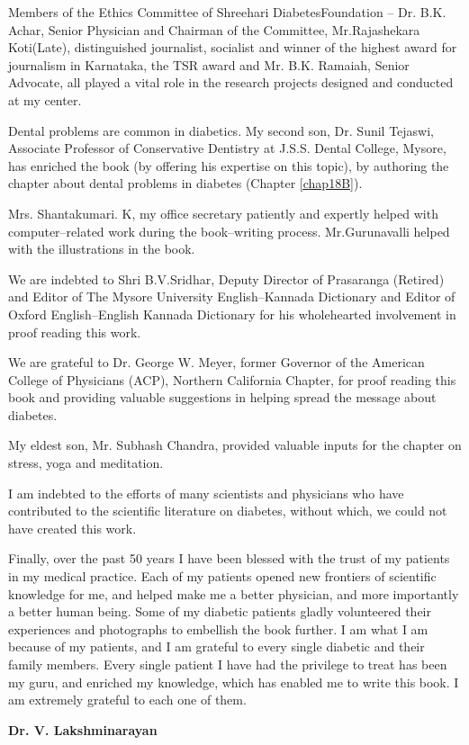 Members of the Ethics Committee of Shreehari Diabetes\break Foundation – Dr. B.K. Achar, Senior Physician and Chairman of the Committee, Mr.Rajashekara Koti(Late), distinguished journa\-list, socia\-list and winner of the highest award for journalism in Karnataka, the TSR award and Mr. B.K. Ramaiah, Senior Advocate, all played a vital role in the research projects designed and conducted at my center.

Dental problems are common in diabetics. My second son, Dr. Sunil Tejaswi, Associate Professor of Conservative Dentistry at J.S.S. Dental College, Mysore, has enriched the book (by offering his expertise on this topic), by authoring the chapter about dental problems in diabetes (Chapter \ref{chap18B}).

Mrs. Shantakumari. K, my office secretary patiently and expertly helped with computer–related work during the book–writing process. Mr.Gurunavalli helped with the illustrations in the book.

We are indebted to Shri B.V.Sridhar, Deputy Director of Prasaranga (Retired) and Editor of The Mysore University English–Kannada Dictionary and Editor of Oxford English–English Kannada Dictionary for his wholehearted involvement in proof reading this work.

We are grateful to Dr. George W. Meyer, former Governor of the American College of Physicians (ACP), Northern California Chapter, for proof reading this book and providing valuable suggestions in helping spread the message about diabetes.

My eldest son, Mr. Subhash Chandra, provided valuable inputs for the chapter on stress, yoga and meditation.

I am indebted to the efforts of many scientists and physicians who have contributed to the scientific literature on diabetes, without which, we could not have created this work.

Finally, over the past 50 years I have been blessed with the trust of my patients in my medical practice. Each of my patients opened new frontiers of scientific knowledge for me, and helped make me a better physician, and more importantly a better human being. Some of my dia\-betic patients gladly volunteered their experiences and photographs to embellish the book further. I am what I am because of my patients, and I am grateful to every single diabetic and their family members. Every single patient I have had the privilege to treat has been my guru, and enriched my knowledge, which has enabled me to write this book. I am extremely grateful to each one of them.

\begin{flushright}
\textbf{Dr. V. Lakshminarayan}
\end{flushright}

